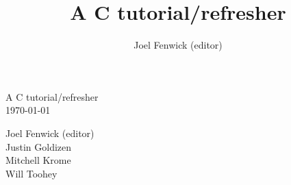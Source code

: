 \documentclass[a4paper,10pt]{book}
\begin{document}
\title{A C tutorial/refresher}
\author{Joel Fenwick (editor)}
\pagestyle{empty}

\vspace*{6cm}
\begin{center}
{\LARGE A C tutorial/refresher}\\
\vspace*{5mm}
{\large \today{}}\\
\end{center}
\vfill
\begin{flushright}
Joel Fenwick (editor)\\
Justin Goldizen\\
Mitchell Krome\\
Will Toohey 
\end{flushright}
\vfill
\vfill

\tableofcontents
{}
\lstset{language=C}












\appendix

\end{document}
